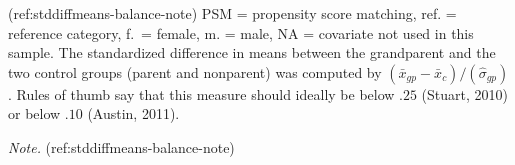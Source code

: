 \begin{appendix}
(ref:stddiffmeans-balance-note) PSM = propensity score matching, ref. =
reference category, f.~= female, m. = male, NA = covariate not used in
this sample. The standardized difference in means between the
grandparent and the two control groups (parent and nonparent) was
computed by \((\bar{x}_{gp}-\bar{x}_{c})/ (\hat\sigma_{gp})\). Rules of
thumb say that this measure should ideally be below \(.25\) (Stuart,
2010) or below \(.10\) (Austin, 2011).

\begin{lltable}

\begin{TableNotes}[para]
\normalsize{\textit{Note.} (ref:stddiffmeans-balance-note)}
\end{TableNotes}

\footnotesize{

}
\end{lltable}
\end{appendix}
